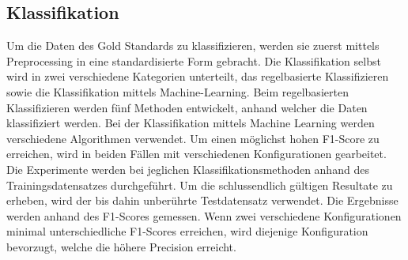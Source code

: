 \subsection{Klassifikation}
Um die Daten des Gold Standards zu klassifizieren, werden sie zuerst mittels Preprocessing in eine standardisierte Form gebracht.
Die Klassifikation selbst wird in zwei verschiedene Kategorien unterteilt, das regelbasierte Klassifizieren sowie die Klassifikation mittels Machine-Learning.
Beim regelbasierten Klassifizieren werden fünf Methoden entwickelt, anhand welcher die Daten klassifiziert werden.
Bei der Klassifikation mittels Machine Learning werden verschiedene Algorithmen verwendet.
Um einen möglichst hohen F1-Score zu erreichen, wird in beiden Fällen mit verschiedenen Konfigurationen gearbeitet.\\
Die Experimente werden bei jeglichen Klassifikationsmethoden anhand des Trainingsdatensatzes durchgeführt.
Um die schlussendlich gültigen Resultate zu erheben, wird der bis dahin unberührte Testdatensatz verwendet.
Die Ergebnisse werden anhand des F1-Scores gemessen.
Wenn zwei verschiedene Konfigurationen minimal unterschiedliche F1-Scores erreichen, wird diejenige Konfiguration bevorzugt, welche die höhere Precision erreicht.
